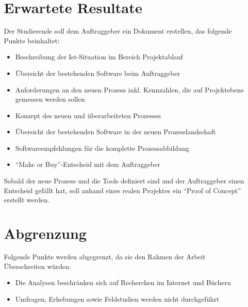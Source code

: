 \section{Erwartete Resultate}
Der Studierende soll dem Auftraggeber ein Dokument erstellen, das folgende 
Punkte beinhaltet: 

\begin{itemize}
    \item Beschreibung der Ist-Situation im Bereich Projektablauf
    \item Übersicht der bestehenden Software beim Auftraggeber
    \item Anforderungen an den neuen Prozess inkl. Kennzahlen, die auf 
        Projektebene gemessen werden sollen
    \item Konzept des neuen und überarbeiteten Prozesses
    \item Übersicht der bestehenden Software in der neuen Prozesslandschaft
    \item Softwareempfehlungen für die komplette Prozessabbildung
    \item ``Make or Buy''-Entscheid mit dem Auftraggeber
\end{itemize}

Sobald der neue Prozess und die Tools definiert sind und der Auftraggeber 
einen Entscheid gefällt hat, soll anhand
eines realen Projektes ein ``Proof of Concept'' erstellt werden.

\section{Abgrenzung}
Folgende Punkte werden abgegrenzt, da sie den Rahmen der Arbeit Überschreiten 
würden:

\begin{itemize}
    \item Die Analysen beschränken sich auf Recherchen im Internet und Büchern
    \item Umfragen, Erhebungen sowie Feldstudien werden nicht durchgeführt
\end{itemize}

